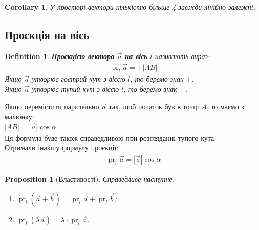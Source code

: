 \documentclass[a4paper, 10pt]{extarticle}
\theoremstyle{theoremdd}
\theoremstyle{theoremdd}
\newtheorem{definition}[theorem]{Definition}
\theoremstyle{theoremdd}
\theoremstyle{theoremdd}
\theoremstyle{theoremdd}
\newtheorem{proposition}[theorem]{Proposition}
\theoremstyle{theoremdd}
\theoremstyle{theoremdd}
\theoremstyle{theoremdd}
\newtheorem{corollary}[theorem]{Corollary}
\DeclareMathOperator{\pr}{pr}
\begin{document}
\begin{corollary}
	У просторі вектори кількістю більше 4 завжди лінійно залежні.
\end{corollary}
	
\subsection{Проєкція на вісь}
\begin{definition}
	\textbf{Проєкцією вектора $\vec{a}$ на вісь $l$} називають вираз:
	\begin{align*}
	\pr_l \vec{a} = \pm |AB|
	\end{align*}
	Якщо $\vec{a}$ утворює гострий кут з віссю $l$, то беремо знак $+$.\\
	Якщо $\vec{a}$ утворює тупий кут з віссю $l$, то беремо знак $-$.
\begin{figure}[H]
\centering
\end{figure}
\end{definition}

	Якщо перемістити паралельно $\vec{a}$ так, щоб початок був в точці $A$, то маємо з малюнку:\\
	$|AB| = |\vec{a}| \cos \alpha$.\\
	Ця формула буде також справедливою при розгляданні тупого кута.\\
	Отримали інакшу формулу проєкції:
	\begin{align*}
	\pr_l \vec{a} = |\vec{a}| \cos \alpha
	\end{align*}
	
\begin{proposition}[Властивості]
Справедливе наступне:
\begin{enumerate}[nosep,wide=0pt,label={\arabic*)}]
	\item $\pr_l (\vec{a} + \vec{b}) = \pr_l \vec{a} + \pr_l \vec{b}$;
	\item $\pr_l (\lambda \vec{a}) = \lambda \cdot \pr_l \vec{a}$.
\end{enumerate}
\end{proposition}
\end{document}
